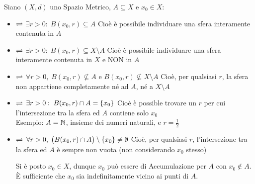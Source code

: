 \begin{definition}
	\label{def:pti_e_spa_metr}
	Siano $(X,d)$ uno Spazio Metrico, $A \subseteq X$ e $x_0 \in X$:
	\begin{itemize}
		\item {} $\rightleftharpoons$ \quad $\exists r > 0:\; B(x_0, r) \subseteq A$\newline
			{\footnotesize Cioè è possibile individuare una sfera interamente contenuta in $A$}
		\item {} $\rightleftharpoons$ \quad $\exists r > 0:\; B(x_0, r) \subseteq X \setminus A$\newline
			{\footnotesize Cioè è possibile individuare una sfera interamente contenuta in $X$ e NON in $A$}
		\item {} $\rightleftharpoons$ \quad $\forall r > 0,\; B(x_0, r) \nsubseteq A \text{ e } B(x_0, r) \nsubseteq X \setminus A$\newline
			{\footnotesize Cioè, per qualsiasi $r$, la sfera non appartiene completamente né ad $A$, né a $X \setminus A$}
		\item {} $\rightleftharpoons$ \quad $\exists r > 0:\; B(x_0, r) \cap A = \left\{x_0\right\}$\newline
			{\footnotesize Cioè è possible trovare un $r$ per cui l'intersezione tra la sfera ed $A$ contiene solo $x_0$\\
			Esempio: $A = \mathbb{N}$, insieme dei numeri naturali, e $r = \frac{1}{2}$}
		\item {} $\rightleftharpoons$ \quad $\forall r > 0,\; \bigl( B(x_0, r) \cap A \bigr) \setminus \left\{x_0\right\} \neq \emptyset$\newline
			{\footnotesize Cioè, per qualsiasi $r$, l'intersezione tra la sfera ed $A$ è sempre non vuota (non considerando $x_0$ stesso)}
			\begin{note}
				Si è posto $x_0 \in X$, dunque $x_0$ può essere di Accumulazione per $A$ con $x_0 \notin A$. È sufficiente che $x_0$ sia indefinitamente vicino ai punti di $A$.
			\end{note}
	\end{itemize}
\end{definition}
